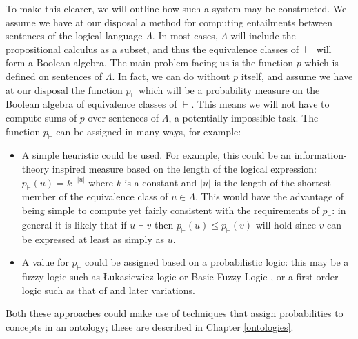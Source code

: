 To make this clearer, we will outline how such a system may be constructed. 
We assume we have at our disposal a method for computing entailments between sentences of the logical language $\Lambda$. In most cases, $\Lambda$ will include the propositional calculus as a subset, and thus the equivalence classes of $\vdash$ will form a Boolean algebra. The main problem facing us is the function $p$ which is defined on sentences of $\Lambda$. In fact, we can do without $p$ itself, and assume we have at our disposal the function $p_\vdash$ which will be a probability measure on the Boolean algebra of equivalence classes of $\vdash$. This means we will not have to compute sums of $p$ over sentences of $\Lambda$, a potentially impossible task. The function $p_\vdash$ can be assigned in many ways, for example:
\begin{itemize}
\item A simple heuristic could be used. For example, this could be an information-theory inspired measure based on the length of the logical expression: $p_\vdash(u) = k^{-|u|}$ where $k$ is a constant and $|u|$ is the length of the shortest member of the equivalence class of $u \in \Lambda$. This would have the advantage of being simple to compute yet fairly consistent with the requirements of $p_\vdash$: in general it is likely that if $u\vdash v$ then $p_\vdash(u) \le p_\vdash(v)$ will hold since $v$ can be expressed at least as simply as $u$.
\item A value for $p_\vdash$ could be assigned based on a probabilistic logic: this may be a fuzzy logic such as \L ukasiewicz logic \citep{Kundu:94} or Basic Fuzzy Logic \citep{Hajek:98}, or a first order logic such as that of \cite{Nilsson:86} and later variations.
\end{itemize}
Both these approaches could make use of techniques that assign probabilities to concepts in an ontology; these are described in Chapter \ref{ontologies}. 

